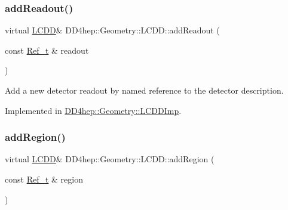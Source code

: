 \hypertarget{class_d_d4hep_1_1_geometry_1_1_l_c_d_d_a9823ad063bd9986e92e66c29f13e28f7}{}\label{class_d_d4hep_1_1_geometry_1_1_l_c_d_d_a9823ad063bd9986e92e66c29f13e28f7} 
\subsubsection{\texorpdfstring{add\+Readout()}{addReadout()}}
{\footnotesize\ttfamily virtual \hyperlink{class_d_d4hep_1_1_geometry_1_1_l_c_d_d}{L\+C\+DD}\& D\+D4hep\+::\+Geometry\+::\+L\+C\+D\+D\+::add\+Readout (\begin{DoxyParamCaption}\item[{const \hyperlink{group___d_d4_h_e_p___g_e_o_m_e_t_r_y_ga40af83be6718bb8828a3d83dc7f8c930}{Ref\+\_\+t} \&}]{readout }\end{DoxyParamCaption})\hspace{0.3cm}{\ttfamily [pure virtual]}}



Add a new detector readout by named reference to the detector description. 



Implemented in \hyperlink{class_d_d4hep_1_1_geometry_1_1_l_c_d_d_imp_a876f792d25fd05a99646cd6c0df77d09}{D\+D4hep\+::\+Geometry\+::\+L\+C\+D\+D\+Imp}.

\hypertarget{class_d_d4hep_1_1_geometry_1_1_l_c_d_d_a633c913dcf2a31b52976e5f5bd8a63e2}{}\label{class_d_d4hep_1_1_geometry_1_1_l_c_d_d_a633c913dcf2a31b52976e5f5bd8a63e2} 
\subsubsection{\texorpdfstring{add\+Region()}{addRegion()}}
{\footnotesize\ttfamily virtual \hyperlink{class_d_d4hep_1_1_geometry_1_1_l_c_d_d}{L\+C\+DD}\& D\+D4hep\+::\+Geometry\+::\+L\+C\+D\+D\+::add\+Region (\begin{DoxyParamCaption}\item[{const \hyperlink{group___d_d4_h_e_p___g_e_o_m_e_t_r_y_ga40af83be6718bb8828a3d83dc7f8c930}{Ref\+\_\+t} \&}]{region }\end{DoxyParamCaption})\hspace{0.3cm}{\ttfamily [pure virtual]}}



